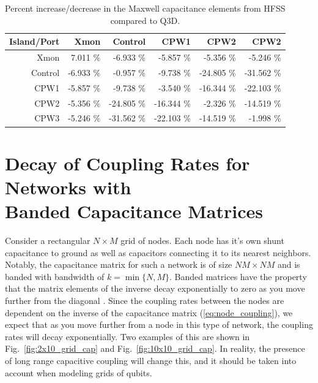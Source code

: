 \begin{table}[h!]
    \centering
    \begin{tabular}{|r|r|r|r|r|r|}
    \hline
    Island/Port & Xmon   & Control & CPW1    & CPW2    & CPW2    \\ \hline
    Xmon        & 7.011 \% & -6.933 \%&     -5.857 \%  &  -5.356 \%  &  -5.246 \%  \\ \hline
    Control     & -6.933 \% & -0.957 \% &   -9.738 \%  & -24.805 \% &  -31.562 \% \\ \hline
    CPW1        & -5.857 \% & -9.738 \% &   -3.540 \%  & -16.344 \% &  -22.103 \% \\ \hline
    CPW2        & -5.356 \% & -24.805 \% & -16.344 \% &   -2.326 \%  & -14.519 \% \\ \hline
    CPW3        & -5.246 \% & -31.562 \% & -22.103 \% &  -14.519 \% &   -1.998 \%  \\ \hline
    \end{tabular}
    \caption{Percent increase/decrease in the Maxwell capacitance elements from HFSS compared to Q3D.}
\end{table}


\newpage
\section[Decay of Coupling Rates for Networks with Banded Capacitance Matrices]{Decay of Coupling Rates for Networks with\\ Banded Capacitance Matrices}\label{appendix:banded_cap}

Consider a rectangular $N \times M$ grid of nodes. Each node has it's own shunt capacitance to ground as well as capacitors connecting it to its nearest neighbors. Notably, the capacitance matrix for such a network is of size $NM \times NM$ and is banded with bandwidth of $k=\min\{N,M\}$. Banded matrices have the property that the matrix elements of the inverse decay exponentially to zero as you move further from the diagonal \cite{banded_1, banded_2}. Since the coupling rates between the nodes are dependent on the inverse of the capacitance matrix (\ref{eq:node_coupling}), we expect that as you move further from a node in this type of network, the coupling rates will decay exponentially. Two examples of this are shown in Fig.\ \ref{fig:2x10_grid_cap} and Fig.\ \ref{fig:10x10_grid_cap}. In reality, the presence of long range capacitive coupling will change this, and it should be taken into account when modeling grids of qubits.

